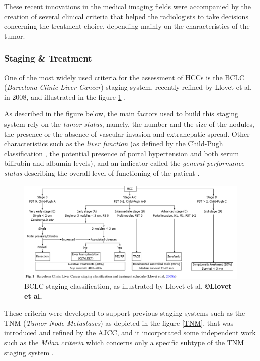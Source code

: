 \documentclass[]{article}
\begin{document}
These recent innovations in the medical imaging fields were accompanied
by the creation of several clinical criteria that helped the
radiologists to take decisions concerning the treatment choice,
depending mainly on the characteristics of the tumor.

\subsubsection*{Staging \& Treatment}\label{staging-treatment}

One of the most widely used criteria for the assessment of HCCs
is the BCLC (\emph{Barcelona Clinic Liver Cancer}) staging system, recently refined by Llovet et al. in
2008, and illustrated in the figure \ref{BCLC_llovet} \cite{Llovet2008}.

As described in the figure below, the main factors used to build this
staging system rely on the \emph{tumor status}, namely, the number and
the size of the nodules, the presence or the absence of vascular
invasion and extrahepatic spread. Other characteristics such as the
\emph{liver function} (as defined by the Child-Pugh classification
\cite{Pugh1973} , the potential presence of portal
hypertension and both serum bilirubin and albumin levels), and an
indicator called the \emph{general performance status} describing the
overall level of functioning of the patient \cite{Oken1982}.

\begin{figure}[th!]
\centering
\includegraphics[width=0.7\linewidth]{images/image9}
\caption{BCLC staging classification, as illustrated by Llovet et al. \textbf{©Llovet et al. \cite{Llovet2008}}}
\label{BCLC_llovet}
\end{figure}



These criteria were developed to support previous staging systems such
as the TNM (\emph{Tumor-Node-Metastases}) as depicted in the figure \ref{TNM}, that was introduced and refined by
the AJCC, and it incorporated some independent work such as the
\emph{Milan criteria} which concerns only a specific subtype of the
TNM staging system \cite{Mazzaferro1996}.
\end{document}
